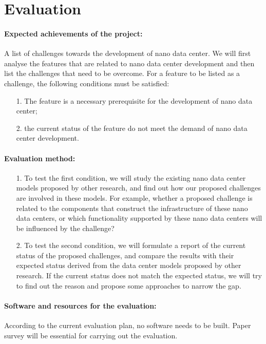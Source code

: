 \documentclass[sigchi-a, authorversion]{acmart}
\begin{document}
\section{Evaluation} %

\paragraph{Expected achievements of the project:} A list of challenges towards the development of nano data center.
We will first analyse the features that are related to nano data center development and then list the challenges that need to be overcome. 
For a feature to be listed as a challenge, 
the following conditions must be satisfied:
\begin{enumerate}
\item[1.] The feature is a necessary prerequisite for the development of nano data center;
\item[2.] the current status of the feature do not meet the demand of nano data center development. 
\end{enumerate}

\paragraph{Evaluation method:} 
\begin{enumerate}
\item[1.] To test the first condition, 
we will study the existing nano data center models proposed by other research, 
and find out how our proposed challenges are involved in these models. 
For example, whether a proposed challenge is related to the components that construct the infrastructure of these nano data centers,
or which functionality supported by these nano data centers will be influenced by the challenge?
\item[2.] To test the second condition,
we will formulate a report of the current status of the proposed challenges,
and compare the results with their expected status derived from the data center models proposed by other research.
If the current status does not match the expected status,
we will try to find out the reason and propose some approaches to narrow the gap.
\end{enumerate}

\paragraph{Software and resources for the evaluation:}
According to the current evaluation plan, no software needs to be built. Paper survey will be essential for carrying out the evaluation.
\end{document}
